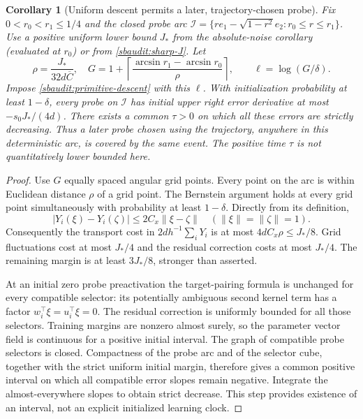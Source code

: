 \documentclass[11pt]{article}
\newtheorem{corollary}[theorem]{Corollary}
\theoremstyle{remark}
\begin{document}
\begin{corollary}[Uniform descent permits a later, trajectory-chosen probe]
\label{sbaudit:uniform-descent}
Fix $0<r_0<r_1\le1/4$ and the closed probe arc
$\mathcal I=\{re_1-\sqrt{1-r^2}e_2:r_0\le r\le r_1\}$.
Use a positive uniform lower bound $J_*$ from the absolute-noise corollary
(evaluated at $r_0$) or from \eqref{sbaudit:sharp-J}.
Let
\[
 \rho=\frac{J_*}{32d\overline C},\quad
 G=1+\left\lceil\frac{\arcsin r_1-\arcsin r_0}{\rho}\right\rceil,
 \qquad \ell=\log(G/\delta).
\]
Impose \eqref{sbaudit:primitive-descent} with this $\ell$.
With initialization probability at least $1-\delta$, every probe on
$\mathcal I$ has initial upper right error derivative at most
$-s_0J_*/(4d)$. There exists a common $\tau>0$ on which all these errors
are strictly decreasing. Thus a later probe chosen using the trajectory,
anywhere in this deterministic arc, is covered by the same event.
The positive time $\tau$ is not quantitatively lower bounded here.
\end{corollary}
\begin{proof}
Use $G$ equally spaced angular grid points. Every point on the arc is
within Euclidean distance $\rho$ of a grid point. The Bernstein argument
holds at every grid point simultaneously with probability at least
$1-\delta$. Directly from its definition,
\[
 |Y_i(\xi)-Y_i(\zeta)|\le2C_x\|\xi-\zeta\|
 \quad(\|\xi\|=\|\zeta\|=1).
\]
Consequently the transport cost in $2d h^{-1}\sum_iY_i$ is at most
$4dC_x\rho\le J_*/8$. Grid fluctuations cost at most $J_*/4$ and
the residual correction costs at most $J_*/4$. The remaining margin
is at least $3J_*/8$, stronger than asserted.

At an initial zero probe preactivation the target-pairing formula is
unchanged for every compatible selector: its potentially ambiguous
second kernel term has a factor $w_i^\top\xi=u_i^\top\xi=0$.
The residual correction is uniformly bounded for all those selectors.
Training margins are nonzero almost surely, so the parameter vector
field is continuous for a positive initial interval. The graph of
compatible probe selectors is closed. Compactness of the probe arc
and of the selector cube, together with the strict uniform initial
margin, therefore gives a common positive interval on which all
compatible error slopes remain negative. Integrate the almost-everywhere
slopes to obtain strict decrease. This step provides existence of an
interval, not an explicit initialized learning clock.
\end{proof}
\end{document}
